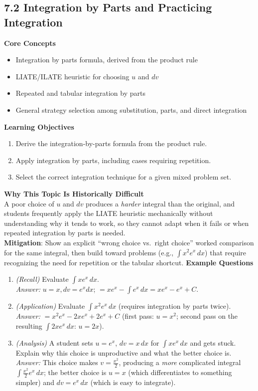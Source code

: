 \documentclass[11pt]{article}
\begin{document}
\subsection{7.2 Integration by Parts and Practicing Integration}
\textbf{Core Concepts}
\begin{itemize}
\item Integration by parts formula, derived from the product rule
\item LIATE/ILATE heuristic for choosing $u$ and $dv$
\item Repeated and tabular integration by parts
\item General strategy selection among substitution, parts, and direct integration
\end{itemize}
\textbf{Learning Objectives}
\begin{enumerate}
\item Derive the integration-by-parts formula from the product rule.
\item Apply integration by parts, including cases requiring repetition.
\item Select the correct integration technique for a given mixed problem set.
\end{enumerate}
\textbf{Why This Topic Is Historically Difficult} \\
A poor choice of $u$ and $dv$ produces a \emph{harder} integral than the original, and students frequently apply the LIATE heuristic mechanically without understanding why it tends to work, so they cannot adapt when it fails or when repeated integration by parts is needed. \\
\textbf{Mitigation}: Show an explicit ``wrong choice vs.\ right choice'' worked comparison for the same integral, then build toward problems (e.g., $\int x^2 e^x\,dx$) that require recognizing the need for repetition or the tabular shortcut.
\textbf{Example Questions}
\begin{enumerate}
\item \emph{(Recall)} Evaluate $\displaystyle\int x e^{x}\,dx$. \\
\textit{Answer:} $u=x, dv=e^x dx$; $=xe^x - \int e^x\,dx = xe^x-e^x+C$.
\item \emph{(Application)} Evaluate $\displaystyle\int x^2 e^{x}\,dx$ (requires integration by parts twice). \\
\textit{Answer:} $=x^2e^x - 2xe^x+2e^x+C$ (first pass: $u=x^2$; second pass on the resulting $\int 2xe^x\,dx$: $u=2x$).
\item \emph{(Analysis)} A student sets $u=e^x$, $dv=x\,dx$ for $\int xe^x\,dx$ and gets stuck. Explain why this choice is unproductive and what the better choice is. \\
\textit{Answer:} This choice makes $v=\tfrac{x^2}{2}$, producing a \emph{more} complicated integral $\int \tfrac{x^2}{2}e^x\,dx$; the better choice is $u=x$ (which differentiates to something simpler) and $dv=e^x\,dx$ (which is easy to integrate).
\end{enumerate}
\end{document}
